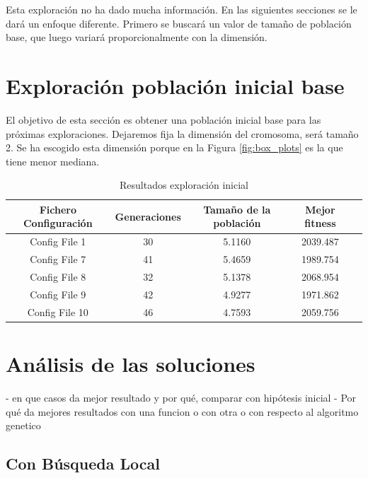 Esta exploración no ha dado mucha información. En las siguientes secciones se le dará un enfoque diferente. Primero se buscará un valor de
tamaño de población base, que luego variará proporcionalmente con la dimensión.


\section{Exploración población inicial base}

El objetivo de esta sección es obtener una población inicial base para las próximas exploraciones. Dejaremos fija la dimensión del cromosoma,
será tamaño 2. Se ha escogido esta dimensión porque en la Figura \ref{fig:box_plots} es la que tiene menor mediana.




\begin{table}[]
    \centering
    \begin{tabular}{||c|c|c|c|c||}
        \hline
        \textbf{Fichero Configuración} & \textbf{Generaciones} & \textbf{Tamaño de la población} & \textbf{Mejor fitness} \\ \hline
        Config File 1   & 30    & 5.1160  & 2039.487   \\ \hline
        Config File 7   & 41    & 5.4659  & 1989.754   \\ \hline
        Config File 8   & 32    & 5.1378  & 2068.954   \\ \hline
        Config File 9   & 42    & 4.9277  & 1971.862   \\ \hline
        Config File 10   & 46    & 4.7593  & 2059.756   \\ \hline
    \end{tabular}
    \caption{Resultados exploración inicial}
    \label{tab:base_population}
\end{table}



\section{Análisis de las soluciones}

- en que casos da mejor resultado y por qué, comparar con hipótesis inicial
- Por qué da mejores resultados con una funcion o con otra o con respecto al algoritmo genetico


\subsection{Con Búsqueda Local}

